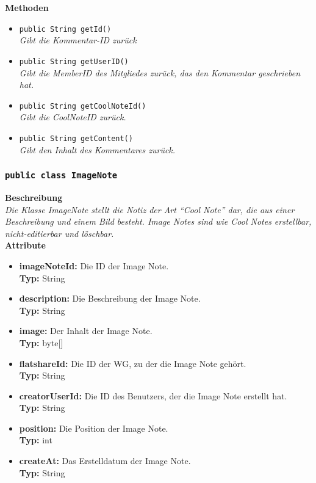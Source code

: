 	\textbf{Methoden}
	\begin{itemize}
		\item\texttt{public String getId()}\\
		\textit{Gibt die Kommentar-ID zurück}\\
		
		\item\texttt{{public String getUserID()}}\\
		\textit{Gibt die MemberID des Mitgliedes zurück, das den Kommentar geschrieben hat.}\\
		
		\item\texttt{{public String getCoolNoteId()}}\\
		\textit{Gibt die CoolNoteID zurück.}\\
		
		\item\texttt{{public String getContent()}}\\
		\textit{Gibt den Inhalt des Kommentares zurück.}\\
	\end{itemize}

\subsubsection{\texttt{public class ImageNote}}

	\textbf{Beschreibung} \\
	\textit{Die Klasse ImageNote stellt die Notiz der Art “Cool Note” dar, die aus einer Beschreibung und einem Bild besteht. Image Notes sind wie Cool Notes erstellbar, nicht-editierbar und löschbar.} \\
	
	\textbf{Attribute}
	\begin{itemize}
		\item \textbf{imageNoteId:} Die ID der Image Note. \\
		\textbf{Typ:} String
		\item \textbf{description:} Die Beschreibung der Image Note. \\
		\textbf{Typ:} String
		\item \textbf{image:} Der Inhalt der Image Note. \\
		\textbf{Typ:} byte[]
		\item \textbf{flatshareId:} Die ID der WG, zu der die Image Note gehört. \\
		\textbf{Typ:} String
		\item \textbf{creatorUserId:} Die ID des Benutzers, der die Image Note erstellt hat. \\
		\textbf{Typ:} String
		\item \textbf{position:} Die Position der Image Note. \\
		\textbf{Typ:} int
		\item \textbf{createAt:} Das Erstelldatum der Image Note.\\
		\textbf{Typ:} String
	\end{itemize}
	
